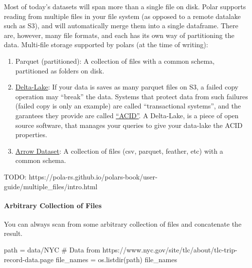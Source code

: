 \documentclass[
  letterpaper,
  DIV=11,
  numbers=noendperiod]{scrartcl}
\let\oldparagraph\paragraph
\renewcommand{\paragraph}[1]{\oldparagraph{#1}\mbox{}}
\newenvironment{Shaded}{\begin{snugshade}}{\end{snugshade}}
\newcommand{\CommentTok}[1]{\textcolor[rgb]{0.37,0.37,0.37}{#1}}
\newcommand{\NormalTok}[1]{\textcolor[rgb]{0.00,0.23,0.31}{#1}}
\newcommand{\OperatorTok}[1]{\textcolor[rgb]{0.37,0.37,0.37}{#1}}
\newcommand{\StringTok}[1]{\textcolor[rgb]{0.13,0.47,0.30}{#1}}
\providecommand{\tightlist}{%
  \setlength{\itemsep}{0pt}\setlength{\parskip}{0pt}}\usepackage{longtable,booktabs,array}
\begin{document}
Most of today's datasets will span more than a single file on disk.
Polar supports reading from multiple files in your file system (as
opposed to a remote datalake such as S3), and will automatically merge
them into a single dataframe. There are, however, many file formats, and
each has its own way of partitioning the data. Multi-file storage
supported by polars (at the time of writing):

\begin{enumerate}
\def\labelenumi{\arabic{enumi}.}
\tightlist
\item
  Parquet (partitioned): A collection of files with a common schema,
  partitioned as folders on disk.
\item
  \href{https://www.databricks.com/wp-content/uploads/2020/08/p975-armbrust.pdf}{Delta-Lake}:
  If your data is saves as many parquet files on S3, a failed copy
  operation may ``break'' the data. Systems that protect data from such
  failures (failed copy is only an example) are called ``transactional
  systems'', and the garantees they provide are called
  \href{https://www.databricks.com/glossary/acid-transactions}{``ACID''}.
  A Delta-Lake, is a piece of open source software, that manages your
  queries to give your data-lake the ACID properties.
\item
  \href{https://arrow.apache.org/docs/python/dataset.html}{Arrow
  Dataset}: A collection of files (csv, parquet, feather, etc) with a
  common schema.
\end{enumerate}

TODO:
https://pola-rs.github.io/polars-book/user-guide/multiple\_files/intro.html

\hypertarget{sec-multiple-files}{%
\paragraph{Arbitrary Collection of Files}\label{sec-multiple-files}}

You can always scan from some arbitrary collection of files and
concatenate the result.

\begin{Shaded}
\begin{Highlighting}[]
\NormalTok{path }\OperatorTok{=} \StringTok{\textquotesingle{}data/NYC\textquotesingle{}} \CommentTok{\# Data from https://www.nyc.gov/site/tlc/about/tlc{-}trip{-}record{-}data.page}
\NormalTok{file\_names }\OperatorTok{=}\NormalTok{ os.listdir(path)}
\NormalTok{file\_names}
\end{Highlighting}
\end{Shaded}
\end{document}
